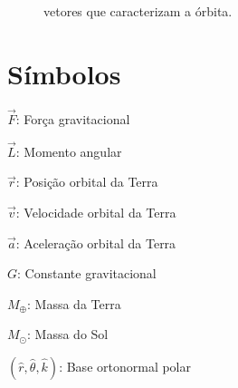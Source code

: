 \documentclass[a4paper, 12pt]{scrartcl}
\newcommand\earthmass{\ensuremath{M_{\oplus}}}
\newcommand\sunmass{\ensuremath{M_{\odot}}}
\begin{document}
	\begin{figure}
		\centering
		
		\caption{vetores que caracterizam a órbita.}
		\label{fig:orbit-vectors}
	\end{figure}

	\section*{Símbolos}
	\begin{compactdesc}
		\item[$\vec F$:] Força gravitacional
		\item[$\vec L$:] Momento angular
		\item[$\vec r$:] Posição orbital da Terra
		\item[$\vec v$:] Velocidade orbital da Terra
		\item[$\vec a$:] Aceleração orbital da Terra
		\item[$G$:] Constante gravitacional
		\item[\earthmass:] Massa da Terra
		\item[\sunmass:] Massa do Sol
		\item[$(\hat r, \hat \theta, \hat k)$:] Base ortonormal polar
	\end{compactdesc}
\end{document}
